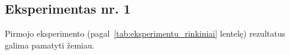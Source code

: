 \subsection{Eksperimentas nr. 1}
\label{subsec:eksperimentas_nr_1}

Pirmojo eksperimento (pagal~\ref{tab:eksperimentu_rinkiniai} lentelę) rezultatus galima pamatyti žemiau.

